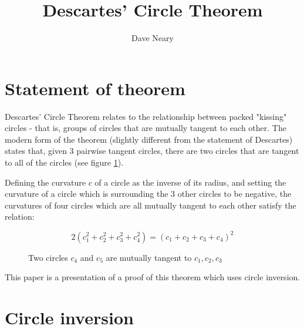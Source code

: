 \documentclass{article}
\begin{document}
\title{Descartes' Circle Theorem}
\author{Dave Neary}

\maketitle

\section{Statement of theorem}

Descartes' Circle Theorem relates to the relationship between packed "kissing" circles -
that is, groups of circles that are mutually tangent to each other. The modern form of
the theorem (slightly different from the statement of Descartes) states that, given 3
pairwise tangent circles, there are two circles that are tangent to all of the circles
(see figure \ref{fig:apollonian_circles}).

Defining the curvature $c$ of a circle as the inverse of its radius, and setting the
curvature of a circle which is surrounding the 3 other circles to be negative, the
curvatures of four circles which are all mutually tangent to each other satisfy 
the relation:

\[ 2(c_1^2 + c_2^2 + c_3^2 + c_4^2) = (c_1 + c_2 + c_3 + c_4)^2 \]

\begin{figure}[htb]
        \caption{Two circles $c_4$ and $c_5$ are mutually tangent to $c_1, c_2, c_3$}
        \label{fig:apollonian_circles}
\end{figure}

This paper is a presentation of a proof of this theorem which uses circle inversion.

\section{Circle inversion}
\end{document}

